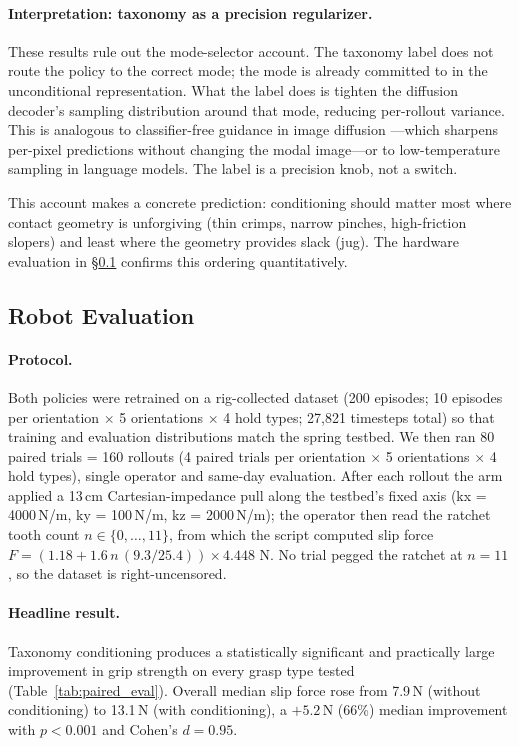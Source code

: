 \documentclass[11pt]{article}
\begin{document}
\paragraph{Interpretation: taxonomy as a precision regularizer.}
These results rule out the mode-selector account. The taxonomy label does not route the
policy to the correct mode; the mode is already committed to in the unconditional
representation. What the label does is tighten the diffusion decoder's sampling
distribution around that mode, reducing per-rollout variance. This is analogous to
classifier-free guidance in image diffusion \citep{ho2022cfg}---which sharpens
per-pixel predictions without changing the modal image---or to low-temperature sampling
in language models. The label is a precision knob, not a switch.

This account makes a concrete prediction: conditioning should matter most where contact
geometry is unforgiving (thin crimps, narrow pinches, high-friction slopers) and least
where the geometry provides slack (jug). The hardware evaluation in
\S\ref{sec:robot_eval} confirms this ordering quantitatively.

\subsection{Robot Evaluation}
\label{sec:robot_eval}

\paragraph{Protocol.}
Both policies were retrained on a rig-collected dataset (200 episodes; 10 episodes per
orientation $\times$ 5 orientations $\times$ 4 hold types; 27{,}821 timesteps total) so
that training and evaluation distributions match the spring testbed. We then ran 80
paired trials = 160 rollouts (4 paired trials per orientation $\times$ 5 orientations
$\times$ 4 hold types), single operator and same-day evaluation. After each rollout
the arm applied a 13\,cm Cartesian-impedance pull along the testbed's fixed axis
(kx = 4000\,N/m, ky = 100\,N/m, kz = 2000\,N/m); the operator then read the ratchet
tooth count $n \in \{0, \dots, 11\}$, from which the script computed slip force
$F = (1.18 + 1.6 \, n \, (9.3 / 25.4)) \times 4.448$ N. No trial pegged the ratchet
at $n = 11$, so the dataset is right-uncensored.

\paragraph{Headline result.}
Taxonomy conditioning produces a statistically significant and practically large
improvement in grip strength on every grasp type tested
(Table~\ref{tab:paired_eval}). Overall median slip force rose from 7.9\,N
(without conditioning) to 13.1\,N (with conditioning), a $+5.2$\,N (66\%) median
improvement with $p < 0.001$ and Cohen's $d = 0.95$.
\end{document}

